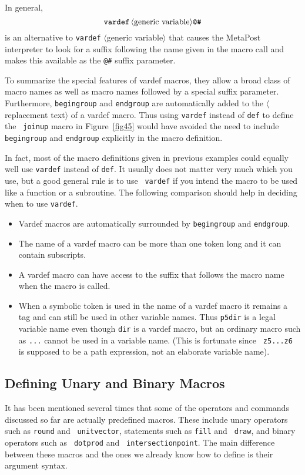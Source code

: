 \documentclass{article} %
\newcommand\descr[1]{{\langle\hbox{#1}\rangle}}
\newcommand\invisgap{\nobreak\hskip0pt\relax}
\newcommand\tdescr[1]{$\langle$\invisgap#1\invisgap$\rangle$}
\begin{document}
In general,
$$ {\tt vardef}\, \descr{generic variable} \hbox{\verb|@#|} $$
is an alternative to {\tt vardef} \tdescr{generic variable} that causes the
MetaPost interpreter
to look for a suffix following the name given in the macro call and makes this
available as the \verb|@#| suffix parameter.

To summarize the special features of vardef macros, they allow a broad
class of macro names as well as macro names followed by a special suffix
parameter.  Furthermore, {\tt begingroup} and {\tt endgroup} are
automatically added to the \tdescr{replacement text} of a vardef macro.
Thus using {\tt vardef} instead of {\tt def} to define the {\tt
joinup} macro in Figure~\ref{fig45} would
have avoided the need to include {\tt begingroup} and {\tt endgroup}
explicitly in the macro definition.

In fact, most of the macro definitions given in previous examples could
equally well use {\tt vardef} instead of {\tt def}.  It usually does not
matter very much which you use, but a good general rule is to use {\tt
vardef} if you intend the macro to be used like a function or a
subroutine.  The following comparison should help in deciding when to
use {\tt vardef}.

\begin{itemize}
\item Vardef macros are automatically surrounded by {\tt begingroup}
and {\tt endgroup}.
\item The name of a vardef macro can be more than one token long and it can
contain subscripts.
\item A vardef macro can have access to the suffix that follows the macro name
when the macro is called.
\item When a symbolic token is used in the name of a vardef macro it remains
a tag and can still be used in other variable names.  Thus
{\tt p5dir} is a legal variable name even though {\tt dir} is a vardef
macro, but an ordinary macro such as {\tt ...}
cannot be used in a variable name.  (This is fortunate since {\tt
z5...z6} is supposed to be a path expression, not an elaborate variable
name).
\end{itemize}


\subsection{Defining Unary and Binary Macros}

It has been mentioned several times that some of the operators and
commands discussed so far are actually predefined macros.  These include
unary operators such as {\tt round} and {\tt
unitvector}, statements such as
{\tt fill} and {\tt
draw}, and binary operators such as {\tt
dotprod} and {\tt
intersectionpoint}.
The main difference between these macros and the ones we already know
how to define is their argument syntax.
\end{document}
